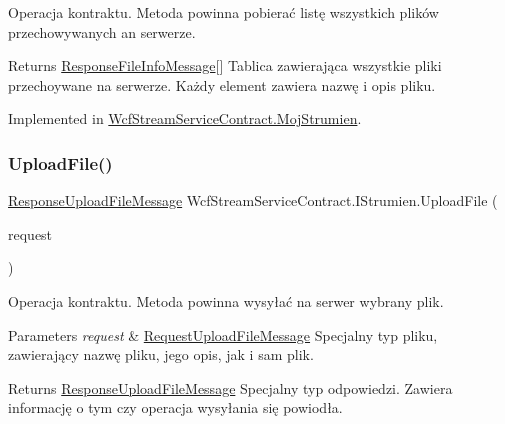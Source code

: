 Operacja kontraktu. Metoda powinna pobierać listę wszystkich plików przechowywanych an serwerze. 

\begin{DoxyReturn}{Returns}
\hyperlink{class_wcf_stream_service_contract_1_1_response_file_info_message}{Response\+File\+Info\+Message}\mbox{[}\mbox{]} Tablica zawierająca wszystkie pliki przechoywane na serwerze. Każdy element zawiera nazwę i opis pliku.
\end{DoxyReturn}


Implemented in \hyperlink{class_wcf_stream_service_contract_1_1_moj_strumien_a48ae5c4785e9603cfcf2aa75e2ecd189}{Wcf\+Stream\+Service\+Contract.\+Moj\+Strumien}.

\mbox{\label{interface_wcf_stream_service_contract_1_1_i_strumien_a1a1d9e27098173c02ad173ace1ef97e3}} 
\subsubsection{\texorpdfstring{Upload\+File()}{UploadFile()}}
{\footnotesize\ttfamily \hyperlink{class_wcf_stream_service_contract_1_1_response_upload_file_message}{Response\+Upload\+File\+Message} Wcf\+Stream\+Service\+Contract.\+I\+Strumien.\+Upload\+File (\begin{DoxyParamCaption}\item[{\hyperlink{class_wcf_stream_service_contract_1_1_request_upload_file_message}{Request\+Upload\+File\+Message}}]{request }\end{DoxyParamCaption})}



Operacja kontraktu. Metoda powinna wysyłać na serwer wybrany plik. 


\begin{DoxyParams}{Parameters}
{\em request} & \hyperlink{class_wcf_stream_service_contract_1_1_request_upload_file_message}{Request\+Upload\+File\+Message} Specjalny typ pliku, zawierający nazwę pliku, jego opis, jak i sam plik.\\
\hline
\end{DoxyParams}
\begin{DoxyReturn}{Returns}
\hyperlink{class_wcf_stream_service_contract_1_1_response_upload_file_message}{Response\+Upload\+File\+Message} Specjalny typ odpowiedzi. Zawiera informację o tym czy operacja wysyłania się powiodła.
\end{DoxyReturn}


